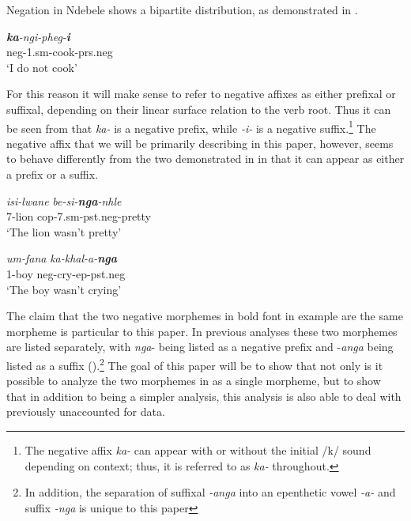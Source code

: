 \documentclass[output=paper]{langsci/langscibook}
\newcommand{\ii}[0]{\textit {-i- }}
\begin{document}
Negation in Ndebele shows a bipartite distribution, as demonstrated in .


\begin{exe}
\ex \gll  \textit{\textbf {ka}-ngi-pheg-\textbf{i}}\\
          {\sc neg}-1.{\sc sm}-cook-{\sc prs.neg}\\
    \glt `I do not cook'
\end{exe}


For this reason it will make sense to refer to negative affixes as either prefixal or suffixal, depending on their linear surface relation to the verb root. Thus it can be seen from  that \textit{ka-} is a negative prefix, while \ii is a negative suffix.\footnote{The negative affix \textit{ka-} can appear with or without the initial /k/ sound depending on context; thus, it is referred to as \textit{ka-} throughout.} The negative affix that we will be primarily describing in this paper, however, seems to behave differently from the two demonstrated in  in that it can appear as either a prefix or a suffix.

\begin{exe}
\ex \begin{xlist}
\ex \gll \textit{isi-lwane}  \textit{be-si-\textbf{nga}-nhle}\\
       7-lion {\sc cop}-7.{\sc sm}-{\sc pst.neg}-pretty\\
    \glt `The lion wasn't pretty' 

\ex \gll \textit{um-fana} \textit{ka-khal-a-\textbf{nga}}\\
         1-boy {\sc neg}-cry-{\sc ep}-{\sc pst.neg}\\
    \glt `The boy wasn't crying'
\end{xlist}
\end{exe}

The claim that the two negative morphemes in bold font in example  are the same morpheme is particular to this paper. In previous analyses these two morphemes are listed separately, with \textit{nga}- being listed as a negative prefix and -\textit{anga} being listed as a suffix (\citealt{Sibanda2004,Khumalo1981,Kumalo1982}).\footnote{In addition, the separation of suffixal \textit{-anga} into an epenthetic vowel \textit{-a-} and suffix \textit{-nga} is unique to this paper} The goal of this paper will be to show that not only is it possible to analyze the two morphemes in  as a single morpheme, but to show that in addition to being a simpler analysis, this analysis is also able to deal with previously unaccounted for data.
\end{document}
